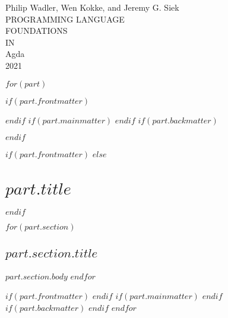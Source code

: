 \documentclass[10pt]{book}
\begin{document}
\setlength{\mathindent}{0pt}
\setlength{\parindent}{0em}
\setlength{\parskip}{1em}

\providecommand{\tightlist}{%
  \setlength{\itemsep}{0pt}\setlength{\parskip}{0pt}}

\begin{titlepage}
  \newlength{\drop}%
  \setlength{\drop}{0.12\textheight}%
  \centering%
  \vspace*{\drop}
  \begingroup%
  {\large Philip Wadler, Wen Kokke, and Jeremy G. Siek}\\[\baselineskip]
  {\Huge PROGRAMMING LANGUAGE}\\[\baselineskip]
  {\Huge FOUNDATIONS}\\[\baselineskip]
  {\Large IN}\\[\baselineskip]
  {\Huge Agda}\\[\drop]
  \vfill%
  {\small\scshape 2021}\par%
  \null\endgroup
\end{titlepage}

$for(part)$

$if(part.frontmatter)$
\frontmatter%
\setcounter{tocdepth}{0}

\tableofcontents%
\setcounter{tocdepth}{1}
$endif$
$if(part.mainmatter)$
\mainmatter%
$endif$
$if(part.backmatter)$
\appendix
{}
$endif$

$if(part.frontmatter)$
$else$
\part{$part.title$}
$endif$

$for(part.section)$
\hypertarget{$part.section.anchor$}{%
  \chapter{$part.section.title$}\label{$part.section.anchor$}}
$part.section.body$
$endfor$

$if(part.frontmatter)$
$endif$
$if(part.mainmatter)$
\cleardoublepage%
%
$endif$
$if(part.backmatter)$
$endif$
$endfor$
\end{document}

